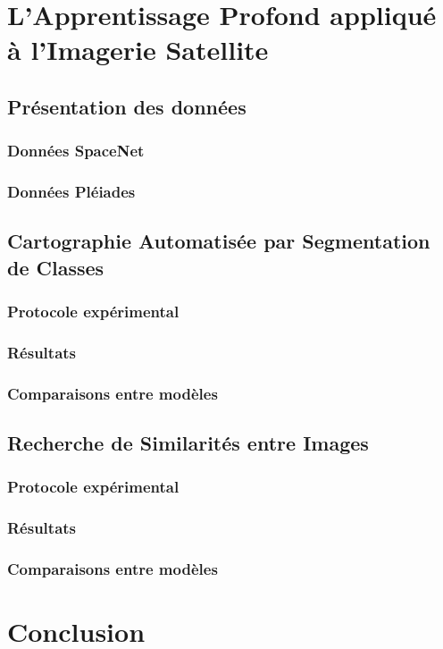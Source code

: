 \documentclass[10pt,a4paper]{report}
\begin{document}
	\chapter{L'Apprentissage Profond appliqué à l'Imagerie Satellite}
		\section{Présentation des données}
			\subsection{Données SpaceNet}
			\subsection{Données Pléiades}
		\section{Cartographie Automatisée par Segmentation de Classes}
			\subsection{Protocole expérimental}
			\subsection{Résultats}
			\subsection{Comparaisons entre modèles}
		\section{Recherche de Similarités entre Images}
			\subsection{Protocole expérimental}
			\subsection{Résultats}
			\subsection{Comparaisons entre modèles}
	\chapter{Conclusion}
\end{document}
